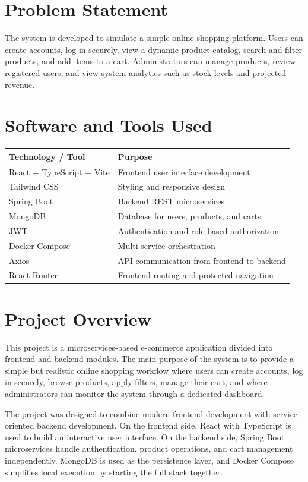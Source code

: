 \documentclass[12pt,a4paper]{article}
\begin{document}
\section*{Problem Statement}
The system is developed to simulate a simple online shopping platform. Users can create accounts, log in securely, view a dynamic product catalog, search and filter products, and add items to a cart. Administrators can manage products, review registered users, and view system analytics such as stock levels and projected revenue.

\section{Software and Tools Used}
\begin{longtable}{|L{4.8cm}|L{9cm}|}
\hline
\textbf{Technology / Tool} & \textbf{Purpose} \\ \hline
React + TypeScript + Vite & Frontend user interface development \\ \hline
Tailwind CSS & Styling and responsive design \\ \hline
Spring Boot & Backend REST microservices \\ \hline
MongoDB & Database for users, products, and carts \\ \hline
JWT & Authentication and role-based authorization \\ \hline
Docker Compose & Multi-service orchestration \\ \hline
Axios & API communication from frontend to backend \\ \hline
React Router & Frontend routing and protected navigation \\ \hline
\end{longtable}

\section{Project Overview}
This project is a microservices-based e-commerce application divided into frontend and backend modules. The main purpose of the system is to provide a simple but realistic online shopping workflow where users can create accounts, log in securely, browse products, apply filters, manage their cart, and where administrators can monitor the system through a dedicated dashboard.

The project was designed to combine modern frontend development with service-oriented backend development. On the frontend side, React with TypeScript is used to build an interactive user interface. On the backend side, Spring Boot microservices handle authentication, product operations, and cart management independently. MongoDB is used as the persistence layer, and Docker Compose simplifies local execution by starting the full stack together.
\end{document}
